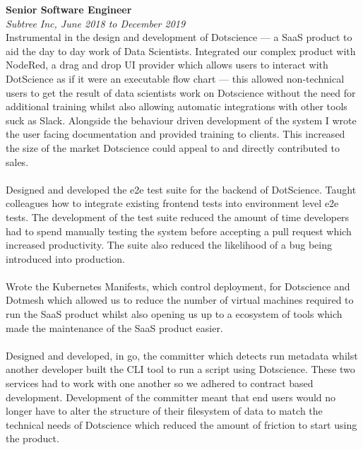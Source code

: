 \documentclass{article}
\begin{document}
\begin{flushleft}
\textbf{Senior Software Engineer}\\
\textit{Subtree Inc, June 2018 to December 2019}\\[5pt]
Instrumental in the design and development of Dotscience — a SaaS product to aid the day to day work of
Data Scientists. Integrated our complex product with NodeRed, a drag and drop UI provider which allows
users to interact with DotScience as if it were an executable flow chart — this allowed non-technical users to
get the result of data scientists work on Dotscience without the need for additional training whilst also
allowing automatic integrations with other tools suck as Slack. Alongside the behaviour driven development
of the system I wrote the user facing documentation and provided training to clients. This increased the size
of the market Dotscience could appeal to and directly contributed to sales.

\paragraph{}Designed and developed the e2e test suite for the backend of DotScience. Taught colleagues how to
integrate existing frontend tests into environment level e2e tests. The development of the test suite reduced
the amount of time developers had to spend manually testing the system before accepting a pull request
which increased productivity. The suite also reduced the likelihood of a bug being introduced into
production.

\paragraph{}Wrote the Kubernetes Manifests, which control deployment, for Dotscience and Dotmesh which allowed
us to reduce the number of virtual machines required to run the SaaS product whilst also opening us up to a
ecosystem of tools which made the maintenance of the SaaS product easier.

\paragraph{}Designed and developed, in go, the committer which detects run metadata whilst another developer built
the CLI tool to run a script using Dotscience. These two services had to work with one another so we
adhered to contract based development. Development of the committer meant that end users would no
longer have to alter the structure of their filesystem of data to match the technical needs of Dotscience
which reduced the amount of friction to start using the product.\\[10pt]


\end{flushleft}
\end{document}
